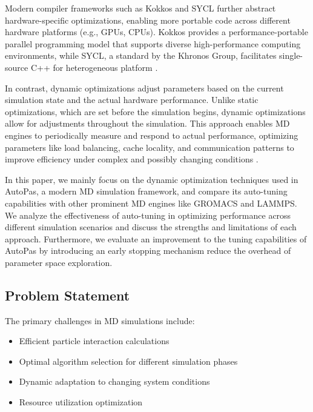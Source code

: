 \documentclass[conference]{IEEEtran}
\begin{document}
Modern compiler frameworks such as Kokkos and SYCL further abstract hardware-specific optimizations, enabling more portable code across different hardware platforms (e.g., GPUs, CPUs). Kokkos provides a performance-portable parallel programming model that supports diverse high-performance computing environments, while SYCL, a standard by the Khronos Group, facilitates single-source C++ for heterogeneous platform .

In contrast, dynamic optimizations adjust parameters based on the current simulation state and the actual hardware performance. Unlike static optimizations, which are set before the simulation begins, dynamic optimizations allow for adjustments throughout the simulation. This approach enables MD engines to periodically measure and respond to actual performance, optimizing parameters like load balancing, cache locality, and communication patterns to improve efficiency under complex and possibly changing conditions .


In this paper, we mainly focus on the dynamic optimization techniques used in AutoPas, a modern MD simulation framework, and compare its auto-tuning capabilities with other prominent MD engines like GROMACS and LAMMPS. We analyze the effectiveness of auto-tuning in optimizing performance across different simulation scenarios and discuss the strengths and limitations of each approach. Furthermore, we evaluate an improvement to the tuning capabilities of AutoPas by introducing an early stopping mechanism reduce the overhead of parameter space exploration.

\subsection{Problem Statement}
The primary challenges in MD simulations include:
\begin{itemize}
    \item Efficient particle interaction calculations
    \item Optimal algorithm selection for different simulation phases
    \item Dynamic adaptation to changing system conditions
    \item Resource utilization optimization
\end{itemize}
\end{document}
